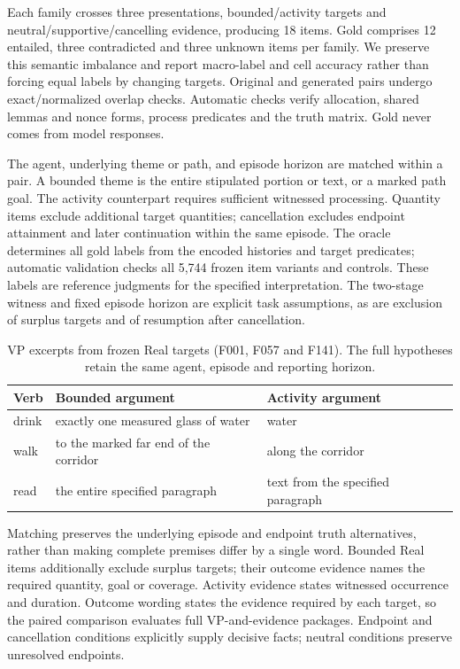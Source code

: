 \documentclass[sigconf,anonymous,review]{acmart}
\begin{document}
Each family crosses three presentations, bounded/activity targets and neutral/supportive/cancelling evidence, producing 18 items. Gold comprises 12 entailed, three contradicted and three unknown items per family. We preserve this semantic imbalance and report macro-label and cell accuracy rather than forcing equal labels by changing targets. Original and generated pairs undergo exact/normalized overlap checks. Automatic checks verify allocation, shared lemmas and nonce forms, process predicates and the truth matrix. Gold never comes from model responses.

The agent, underlying theme or path, and episode horizon are matched within a pair. A bounded theme is the entire stipulated portion or text, or a marked path goal. The activity counterpart requires sufficient witnessed processing. Quantity items exclude additional target quantities; cancellation excludes endpoint attainment and later continuation within the same episode. The oracle determines all gold labels from the encoded histories and target predicates; automatic validation checks all 5,744 frozen item variants and controls. These labels are reference judgments for the specified interpretation. The two-stage witness and fixed episode horizon are explicit task assumptions, as are exclusion of surplus targets and of resumption after cancellation.

\begin{table}[t]
\centering
\caption{VP excerpts from frozen Real targets (F001, F057 and F141). The full hypotheses retain the same agent, episode and reporting horizon.}
\label{tab:vp_examples}
\setlength{\tabcolsep}{3pt}
\begin{tabular}{@{}l>{\raggedright\arraybackslash}p{}>{\raggedright\arraybackslash}p{}@{}}
\toprule
Verb & Bounded argument & Activity argument\\
\midrule
drink & exactly one measured glass of water & water\\
walk & to the marked far end of the corridor & along the corridor\\
read & the entire specified paragraph & text from the specified paragraph\\
\bottomrule
\end{tabular}
\end{table}

Matching preserves the underlying episode and endpoint truth alternatives, rather than making complete premises differ by a single word. Bounded Real items additionally exclude surplus targets; their outcome evidence names the required quantity, goal or coverage. Activity evidence states witnessed occurrence and duration. Outcome wording states the evidence required by each target, so the paired comparison evaluates full VP-and-evidence packages. Endpoint and cancellation conditions explicitly supply decisive facts; neutral conditions preserve unresolved endpoints.
\end{document}

